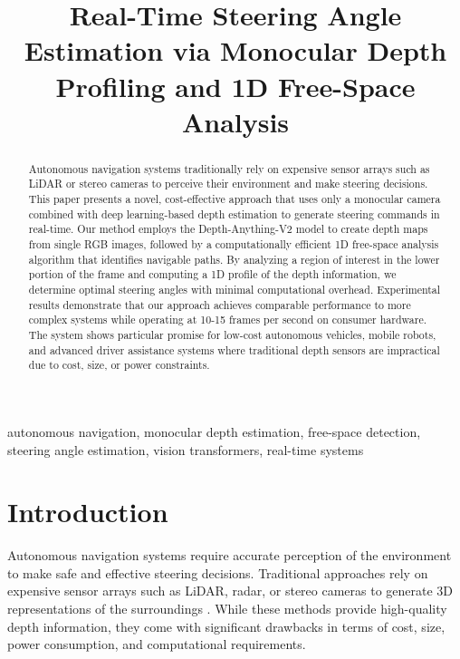 \documentclass[conference]{IEEEtran}
\begin{document}
\title{Real-Time Steering Angle Estimation via Monocular Depth Profiling and 1D Free-Space Analysis}

\author{
\and
{}
}

\maketitle

\begin{abstract}
Autonomous navigation systems traditionally rely on expensive sensor arrays such as LiDAR or stereo cameras to perceive their environment and make steering decisions. This paper presents a novel, cost-effective approach that uses only a monocular camera combined with deep learning-based depth estimation to generate steering commands in real-time. Our method employs the Depth-Anything-V2 model to create depth maps from single RGB images, followed by a computationally efficient 1D free-space analysis algorithm that identifies navigable paths. By analyzing a region of interest in the lower portion of the frame and computing a 1D profile of the depth information, we determine optimal steering angles with minimal computational overhead. Experimental results demonstrate that our approach achieves comparable performance to more complex systems while operating at 10-15 frames per second on consumer hardware. The system shows particular promise for low-cost autonomous vehicles, mobile robots, and advanced driver assistance systems where traditional depth sensors are impractical due to cost, size, or power constraints.
\end{abstract}

\begin{IEEEkeywords}
autonomous navigation, monocular depth estimation, free-space detection, steering angle estimation, vision transformers, real-time systems
\end{IEEEkeywords}

\section{Introduction}
Autonomous navigation systems require accurate perception of the environment to make safe and effective steering decisions. Traditional approaches rely on expensive sensor arrays such as LiDAR, radar, or stereo cameras to generate 3D representations of the surroundings \cite{b1}. While these methods provide high-quality depth information, they come with significant drawbacks in terms of cost, size, power consumption, and computational requirements.
\end{document}
